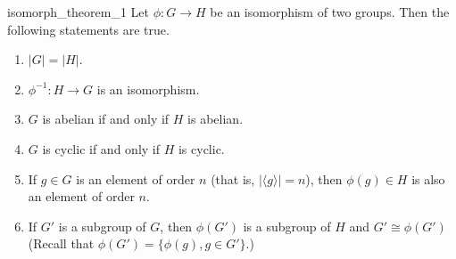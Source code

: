 \begin{prop}{isomorph_theorem_1}
Let $\phi : G \rightarrow H$ be an isomorphism of two groups.  Then the following statements are true. 
\begin{enumerate}[(1)]
 

\rm \item 
$|G| = |H|$. 

\rm \item 
$\phi^{-1} : H \rightarrow G$ is an isomorphism. 

\rm \item 
$G$ is abelian if and only if $H$ is abelian. 

\rm \item 
$G$ is cyclic if and only if $H$ is cyclic. 

\rm \item
If $g \in G$ is an element of order $n$ (that is, $| \langle g \rangle | = n$), then 
$\phi(g) \in H$ is also an element of order $n$.

\rm \item 
If $G'$  is a subgroup of $G$, then $\phi(G') $ is a subgroup of  $H$ and $G' \cong \phi(G')$  (Recall that $\phi(G') = \{ \phi(g), g \in G'\}$.)
 
\end{enumerate}
\end{prop}

